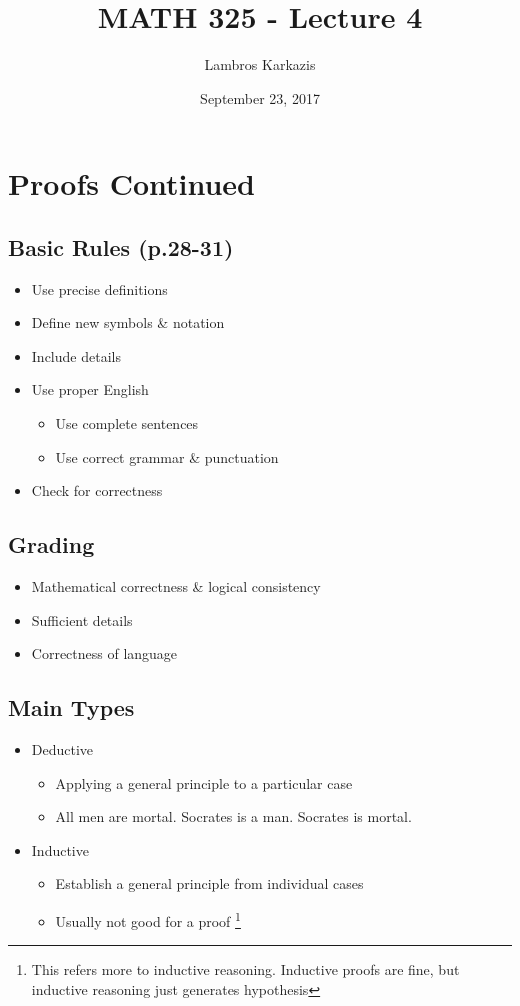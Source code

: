 \documentclass{article}
\title{MATH 325 - Lecture 4}
\author{Lambros Karkazis}
\date{September 23, 2017}
\begin{document}
\maketitle
\section{Proofs Continued}
\subsection{Basic Rules (p.28-31)}
\begin{itemize}
	\item Use precise definitions
	\item Define new symbols \& notation
	\item Include details
	\item Use proper English
	\begin{itemize}
		\item Use complete sentences
		\item Use correct grammar \& punctuation
	\end{itemize}
	\item Check for correctness
\end{itemize}

\subsection{Grading}
\begin{itemize}
	\item Mathematical correctness \& logical consistency
	\item Sufficient details
	\item Correctness of language
\end{itemize}

\subsection{Main Types}

\begin{itemize}
	\item Deductive
	\begin{itemize}
		\item Applying a general principle to a particular case
		\item All men are mortal. Socrates is a man. Socrates is mortal.
	\end{itemize}
	\item Inductive
	\begin{itemize}
		\item Establish a general principle from individual cases
		\item Usually not good for a proof \footnote{This refers more to inductive reasoning. Inductive proofs are fine, but inductive reasoning just generates hypothesis}
	\end{itemize}
\end{itemize}
\end{document}
